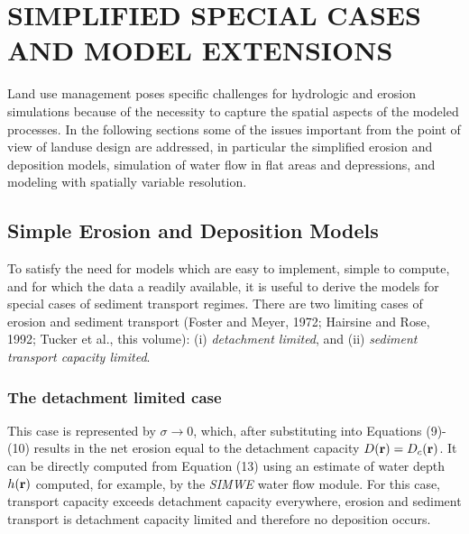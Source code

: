 \documentclass{kapedbk} %
\begin{document}
\bigskip
\noindent
\section{SIMPLIFIED SPECIAL CASES AND MODEL EXTENSIONS}

Land use management poses specific challenges for hydrologic and erosion
simulations because of the necessity to capture the spatial aspects
of the modeled processes.
In the following sections some of the issues
important from the point of view of landuse design
are addressed, in particular the
simplified erosion and deposition models,
simulation of water flow in flat areas and depressions,
and modeling with spatially variable resolution.

\bigskip \medskip \noindent
\subsection{Simple Erosion and Deposition Models }

\medskip
To satisfy the need for models which are easy to implement, 
simple to compute, and for which the data a readily available,
it is useful to derive the models  for special cases
of sediment transport regimes.
There are two limiting cases of erosion and sediment transport
(Foster and Meyer, 1972; Hairsine and Rose, 1992; Tucker et al., this volume):
(i) {\sl detachment limited},
and (ii) {\sl sediment transport capacity limited}.

\medskip
\noindent
\subsubsection{The detachment limited case} 

\quad 

\medskip
This case is represented by $\sigma \to 0$, which,
after substituting into Equations (9)-(10) results in the net erosion
equal to the detachment capacity 
$ D({\bf r})=D_c({\bf r})$.
It can be directly computed from Equation (13) using an estimate of
water depth $ h({\bf r})$ computed, for example, by the {\sl SIMWE}
 water flow module. 
 For this case, transport capacity exceeds
detachment capacity everywhere, erosion and sediment transport is detachment
capacity limited and therefore no deposition occurs.
\end{document}
